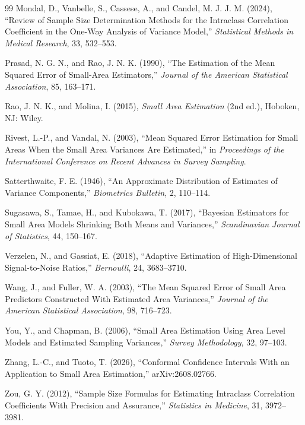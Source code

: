 \begin{thebibliography}{99}
Mondal, D., Vanbelle, S., Cassese, A., and Candel, M. J. J. M. (2024), ``Review of
Sample Size Determination Methods for the Intraclass Correlation Coefficient in
the One-Way Analysis of Variance Model,'' \emph{Statistical Methods in Medical
Research}, 33, 532--553.

Prasad, N. G. N., and Rao, J. N. K. (1990), ``The Estimation of the Mean Squared
Error of Small-Area Estimators,'' \emph{Journal of the American Statistical
Association}, 85, 163--171.

Rao, J. N. K., and Molina, I. (2015), \emph{Small Area Estimation} (2nd ed.),
Hoboken, NJ: Wiley.

Rivest, L.-P., and Vandal, N. (2003), ``Mean Squared Error Estimation for Small
Areas When the Small Area Variances Are Estimated,'' in \emph{Proceedings of the
International Conference on Recent Advances in Survey Sampling}.

Satterthwaite, F. E. (1946), ``An Approximate Distribution of Estimates of
Variance Components,'' \emph{Biometrics Bulletin}, 2, 110--114.

Sugasawa, S., Tamae, H., and Kubokawa, T. (2017), ``Bayesian Estimators for Small
Area Models Shrinking Both Means and Variances,'' \emph{Scandinavian Journal of
Statistics}, 44, 150--167.

Verzelen, N., and Gassiat, E. (2018), ``Adaptive Estimation of High-Dimensional
Signal-to-Noise Ratios,'' \emph{Bernoulli}, 24, 3683--3710.

Wang, J., and Fuller, W. A. (2003), ``The Mean Squared Error of Small Area
Predictors Constructed With Estimated Area Variances,'' \emph{Journal of the
American Statistical Association}, 98, 716--723.

You, Y., and Chapman, B. (2006), ``Small Area Estimation Using Area Level Models
and Estimated Sampling Variances,'' \emph{Survey Methodology}, 32, 97--103.

Zhang, L.-C., and Tuoto, T. (2026), ``Conformal Confidence Intervals With an
Application to Small Area Estimation,'' arXiv:2608.02766.

Zou, G. Y. (2012), ``Sample Size Formulas for Estimating Intraclass Correlation
Coefficients With Precision and Assurance,'' \emph{Statistics in Medicine}, 31,
3972--3981.

\end{thebibliography}
